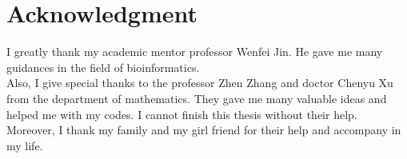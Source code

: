\section{Acknowledgment}
I greatly thank my academic mentor professor Wenfei Jin. He gave me many guidances in the field of bioinformatics. \\
Also, I give special thanks to the professor Zhen Zhang and doctor Chenyu Xu from the department of mathematics. They gave me many valuable ideas and helped me with my codes. I cannot finish this thesis without their help. \\
Moreover, I thank my family and my girl friend for their help and accompany in my life.

